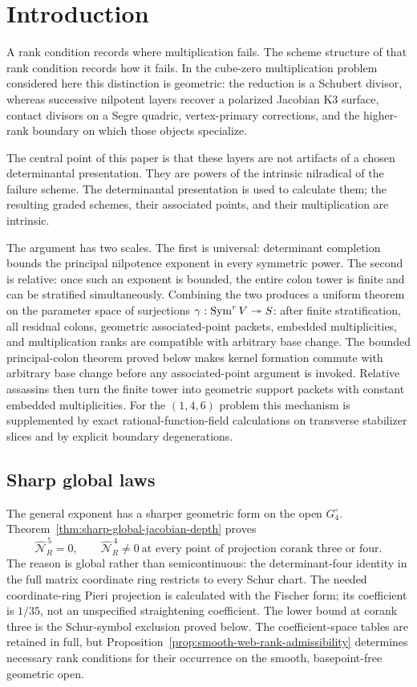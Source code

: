 \section{Introduction}
\label{sec:introduction-v131}

A rank condition records where multiplication fails.  The scheme
structure of that rank condition records how it fails.  In the
cube-zero multiplication problem considered here this distinction is
geometric: the reduction is a Schubert divisor, whereas successive
nilpotent layers recover a polarized Jacobian K3 surface, contact
divisors on a Segre quadric, vertex-primary corrections, and the
higher-rank boundary on which those objects specialize.

The central point of this paper is that these layers are not artifacts
of a chosen determinantal presentation.  They are powers of the
intrinsic nilradical of the failure scheme.  The determinantal
presentation is used to calculate them; the resulting graded schemes,
their associated points, and their multiplication are intrinsic.

The argument has two scales.  The first is universal: determinant
completion bounds the principal nilpotence exponent in every symmetric
power.  The second is relative: once such an exponent is bounded, the
entire colon tower is finite and can be stratified simultaneously.
Combining the two produces a uniform theorem on the parameter space of
surjections \(\gamma:\operatorname{Sym}^rV\twoheadrightarrow S\): after finite
stratification, all residual colons, geometric associated-point packets,
embedded multiplicities, and multiplication ranks are compatible with
arbitrary base change.
The bounded principal-colon theorem proved below makes kernel formation
commute with arbitrary base change before any associated-point
argument is invoked.  Relative assassins then turn the finite tower
into geometric support packets with constant embedded multiplicities.
For the \((1,4,6)\) problem this mechanism is supplemented by exact
rational-function-field calculations on transverse stabilizer slices
and by explicit boundary degenerations.

\subsection{Sharp global laws}

The general exponent has a sharper geometric form on the open
\(G_4^\circ\).  Theorem~\ref{thm:sharp-global-jacobian-depth} proves
\[
 \widehat{\mathcal N}_R^{\,5}=0,
 \qquad \widehat{\mathcal N}_R^{\,4}\ne0
 \ \text{at every point of projection corank three or four}.
\]
The reason is global rather than semicontinuous: the determinant-four
identity in the full matrix coordinate ring restricts to every Schur
chart.  The needed coordinate-ring Pieri projection is calculated with
the Fischer form; its coefficient is \(1/35\), not an unspecified
straightening coefficient.  The lower bound at corank three is the
Schur-symbol exclusion proved below.  The coefficient-space tables
are retained in full, but Proposition~\ref{prop:smooth-web-rank-admissibility}
determines necessary rank conditions for their occurrence on the
smooth, basepoint-free geometric open.

